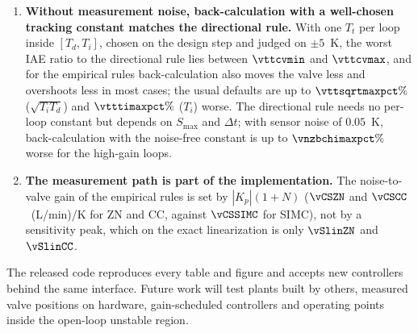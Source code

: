\begin{enumerate}
    \item \textbf{Without measurement noise, back-calculation with a well-chosen tracking constant matches the directional rule.} With one $T_t$ per loop inside $[T_d, T_i]$, chosen on the design step and judged on $\pm 5$~K, the worst IAE ratio to the directional rule lies between $\vttcvmin$ and $\vttcvmax$, and for the empirical rules back-calculation also moves the valve less and overshoots less in most cases; the usual defaults are up to $\vttsqrtmaxpct\%$ ($\sqrt{T_iT_d}$) and $\vtttimaxpct\%$ ($T_i$) worse. The directional rule needs no per-loop constant but depends on $S_{\max}$ and $\Delta t$; with sensor noise of $0.05$~K, back-calculation with the noise-free constant is up to $\vnzbchimaxpct\%$ worse for the high-gain loops.
    \item \textbf{The measurement path is part of the implementation.} The noise-to-valve gain of the empirical rules is set by $|K_p|(1+N)$ ($\vCSZN$ and $\vCSCC$~(L/min)/K for ZN and CC, against $\vCSSIMC$ for SIMC), not by a sensitivity peak, which on the exact linearization is only $\vSlinZN$ and $\vSlinCC$.
\end{enumerate}
The released code reproduces every table and figure and accepts new controllers behind the same interface. Future work will test plants built by others, measured valve positions on hardware, gain-scheduled controllers and operating points inside the open-loop unstable region.
